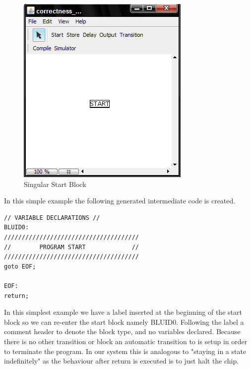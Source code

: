 \begin{figure}[htb]
	\centering
	\includegraphics[width=\imgmedphoto]{./images/correctness_ex_start.png}
	\caption{Singular Start Block}
	\label{fig:correctness_ex_start}
\end{figure}
In this simple example the following generated intermediate code  is created.

\begin{minipage}{\textwidth}
\begin{lstlisting}[frame=single]
// VARIABLE DECLARATIONS //
BLUID0:
//////////////////////////////////////
//        PROGRAM START             //
//////////////////////////////////////
goto EOF;

EOF:
return;
\end{lstlisting}
\end{minipage}

In this simplest example we have a label inserted at the beginning of the start block so we can re-enter the start block namely BLUID0. Following the label a comment header to denote the block type, and no variables declared.  Because there is no other transition or block an automatic transition to  is setup in order to terminate the program. In our system this is analogous to "staying in a state indefinitely" as the behaviour after return is executed is to just halt the chip.

